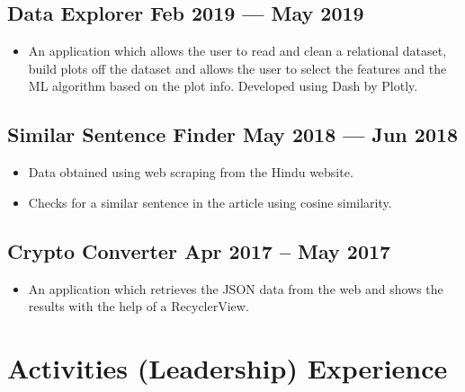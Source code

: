 \documentclass[a4,10pt]{article}
\newenvironment{zitemize}{
\begin{itemize}\itemsep0pt \parskip0pt \parsep1pt}
{\end{itemize}\vspace{-0.5cm}}
\begin{document}
\subsection*{Data Explorer \hfill Feb 2019 --- May 2019} 
    \begin{zitemize}
        \item An application which allows the user to read and clean a relational dataset, build plots off the dataset and allows the user to select the features and the ML algorithm based on the plot info. Developed using Dash by Plotly.
    \end{zitemize}


\subsection*{Similar Sentence Finder \hfill May 2018 --- Jun 2018} 
    \begin{zitemize}
        \item Data obtained using web scraping from the Hindu website. 
        \item Checks for a similar sentence in the article using cosine similarity.
    \end{zitemize}


\subsection*{Crypto Converter \hfill Apr 2017 – May 2017} 
    \begin{zitemize}
        \item An application which retrieves the JSON data from the web and shows the results with the help of a RecyclerView.
    \end{zitemize}



\section{Activities (Leadership) Experience}
\end{document}
